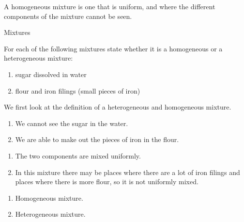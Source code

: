  {A homogeneous mixture is one that is uniform, and where the different components of the mixture cannot be seen. } 
\label{m38708*eip-479}
      \begin{wex}{Mixtures}
{For each of the following mixtures state whether it is a homogeneous or a heterogeneous mixture:
\label{m38708*eip-id1167649056231}\begin{enumerate}[noitemsep, label=\textbf{\alph*}. ] 
\item sugar dissolved in water
\item flour and iron filings (small pieces of iron)
\end{enumerate} }
{
We first look at the definition of a heterogeneous and homogeneous mixture.
\begin{enumerate}[noitemsep, label=\textbf{\alph*}. ] 
\item We cannot see the sugar in the water.
\item We are able to make out the pieces of iron in the flour.
 \end{enumerate}
\begin{enumerate}[noitemsep, label=\textbf{\alph*}. ] 
\item The two components are mixed uniformly.
\item In this mixture there may be places where there are a lot of iron filings and places where there is more flour, so it is not uniformly mixed.
\end{enumerate}
\begin{enumerate}[noitemsep, label=\textbf{\alph*}. ] 
\item Homogeneous mixture.
\item Heterogeneous mixture.\end{enumerate}}
    \end{wex}
